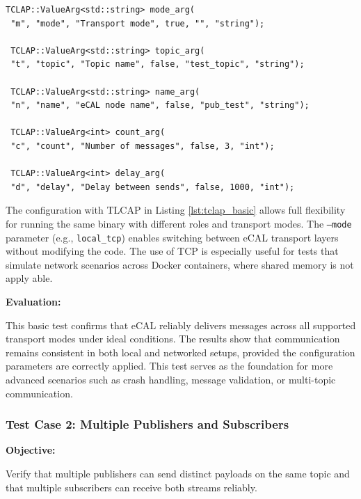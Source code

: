 \begin{lstlisting}[style=cppstyle, caption={Argument setup using TCLAP in both publisher and subscriber}, label={lst:tclap_basic}, captionpos=b]
 TCLAP::ValueArg<std::string> mode_arg(
 "m", "mode", "Transport mode", true, "", "string");
 
 TCLAP::ValueArg<std::string> topic_arg(
 "t", "topic", "Topic name", false, "test_topic", "string");
 
 TCLAP::ValueArg<std::string> name_arg(
 "n", "name", "eCAL node name", false, "pub_test", "string");
 
 TCLAP::ValueArg<int> count_arg(
 "c", "count", "Number of messages", false, 3, "int");
 
 TCLAP::ValueArg<int> delay_arg(
 "d", "delay", "Delay between sends", false, 1000, "int");
\end{lstlisting}

\vspace{0.4em}
The configuration with TLCAP in Listing \ref{lst:tclap_basic} allows full flexibility for running the same binary with different roles and transport modes. The \texttt{--mode} parameter (e.g., \texttt{local\_tcp}) enables switching between eCAL transport layers without modifying the code. The use of TCP is especially useful for tests that simulate network scenarios across Docker containers, where shared memory is not apply able.

\vspace{1em}

\textbf{Evaluation:}

\vspace{0.4em}
This basic test confirms that eCAL reliably delivers messages across all supported transport modes under ideal conditions. The results show that communication remains consistent in both local and networked setups, provided the configuration parameters are correctly applied. This test serves as the foundation for more advanced scenarios such as crash handling, message validation, or multi-topic communication.


\vspace{1em}
\vspace{1em}
\subsubsection{Test Case 2: Multiple Publishers and Subscribers}

\textbf{Objective:}

\vspace{0.4em}
Verify that multiple publishers can send distinct payloads on the same topic and that multiple subscribers can receive both streams reliably.

